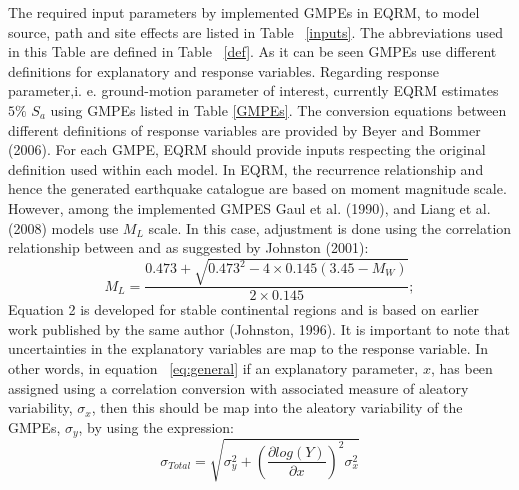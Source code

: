 The required input parameters by implemented GMPEs in EQRM, to model
source, path and site effects are listed in Table ~\ref{inputs}. The
abbreviations used in this Table are defined in Table ~\ref{def}. As
it can be seen GMPEs use different definitions for explanatory and
response variables. Regarding response parameter,i. e. ground-motion
parameter of interest, currently EQRM estimates $5 \%$ $S_a$ using
GMPEs listed in Table \ref{GMPEs}. The conversion equations between
different definitions of response variables are provided by Beyer
and Bommer (2006).  For each GMPE, EQRM should provide inputs
respecting the original definition used within each model. In EQRM,
the recurrence relationship and hence the generated earthquake
catalogue are based on moment magnitude scale. However, among the
implemented GMPES Gaul et al. (1990), and Liang et al. (2008) models
use $M_L$ scale. In this case, adjustment is done using the
correlation relationship between and as suggested by Johnston
(2001):
\begin{equation}
M_L =
\frac{0.473+\sqrt{0.473^2-4\times0.145(3.45-M_W)}}{2\times0.145};
\end{equation}
Equation 2 is developed for stable continental regions and is based
on earlier work published by the same author (Johnston, 1996). It is
important to note that uncertainties in the explanatory variables
are map to the response variable. In other words, in equation
~\ref{eq:general} if an explanatory parameter, $x$, has been
assigned using a correlation conversion with associated measure of
aleatory variability, $\sigma_x$, then this should be map into the
aleatory variability of the GMPEs, $\sigma_y$, by using the
expression:
\begin{equation}
\sigma_{Total} = \sqrt{\sigma_y^2+(\dfrac{\partial log(Y)}{\partial
x})^2 \sigma_x^2}
\end{equation}

